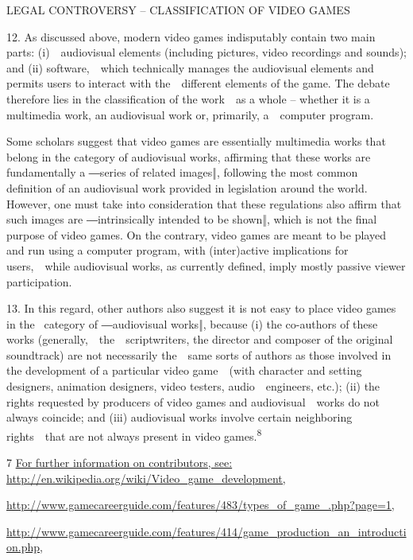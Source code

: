 \documentclass[
]{article}
\begin{document}
{LEGAL CONTROVERSY }{-- }{CLASSIFICATION OF VIDEO GAMES}

{12. }{As discussed above, modern video games indisputably contain two
main parts: (i)~~audiovisual elements (including pictures, video
recordings and sounds); and (ii) software,~~which technically manages
the audiovisual elements and permits users to interact with
the~~different elements of the game. The debate therefore lies in the
classification of the work~~as a whole }{-- }{whether it is a multimedia
work, an audiovisual work or, primarily, a~~computer program.}

{Some scholars suggest that video games are essentially multimedia works
that belong in }{the category of audiovisual works, affirming that these
works are fundamentally a ―}{series of related images}{‖, following the
most common definition of an audiovisual work provided }{in legislation
around the world. However, one must take into consideration that these
}{regulations also affirm that such images are ―}{intrinsically intended
to be shown}{‖, which is }{not the final purpose of video games. On the
contrary, video games are meant to be played and run using a computer
program, with (inter)active implications for users,~~while audiovisual
works, as currently defined, imply mostly passive viewer participation.}

{13. }{In this regard, other authors also suggest it is not easy to
place video games in the }{~category of ―audiovisual works‖, because (i)
}{the co-authors of these works (generally,~~the~~scriptwriters, the
director and composer of the original soundtrack) are not necessarily
the~~same sorts of authors as those involved in the development of a
particular video game~~(with character and setting designers, animation
designers, video testers, audio~~engineers, etc.); (ii) the rights
requested by producers of video games and audiovisual~~works do not
always coincide; and (iii) audiovisual works involve certain neighboring
rights~~that are not always present in video
games.}\textsuperscript{{8}}

{7 }\href{http://en.wikipedia.org/wiki/Video_game_development}{{For
further information on contributors, see:
http://en.wikipedia.org/wiki/Video\_game\_development,}}

\href{http://www.gamecareerguide.com/features/483/types_of_game_.php?page=1}{{http://www.gamecareerguide.com/features/483/types\_of\_game\_.php?page=1,}}

\href{http://www.gamecareerguide.com/features/414/game_production_an_introduction.php}{{http://www.gamecareerguide.com/features/414/game\_production\_an\_introduction.php,}}
\end{document}
